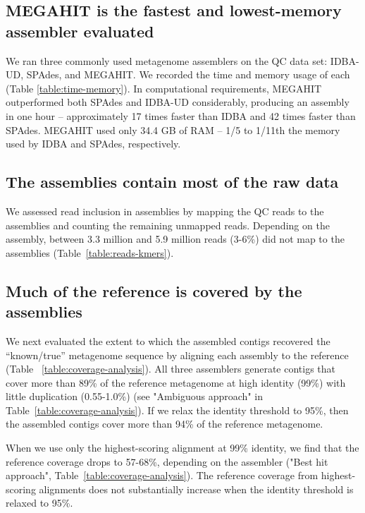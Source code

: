 \documentclass[10pt,a4paper,twocolumn]{article}
\begin{document}
\subsection*{MEGAHIT is the fastest and lowest-memory assembler evaluated}

We ran three commonly used metagenome assemblers on the QC data set:
IDBA-UD, SPAdes, and MEGAHIT. We recorded the time and memory usage of
each (Table \ref{table:time-memory}).  In computational requirements, MEGAHIT outperformed both
SPAdes and IDBA-UD considerably, producing an assembly in one hour --
approximately 17 times faster than IDBA and 42 times faster than
SPAdes.  MEGAHIT used only 34.4 GB of RAM -- 1/5 to 1/11th
the memory used by IDBA and SPAdes, respectively.

\subsection*{The assemblies contain most of the raw data}

We assessed read inclusion in assemblies by mapping the QC reads to
the assemblies and counting the remaining unmapped reads. Depending on
the assembly, between 3.3 million and 5.9 million reads (3-6\%)
did not map to the assemblies (Table~\ref{table:reads-kmers}).

\subsection*{Much of the reference is covered by the assemblies}

We next evaluated the extent to which the assembled contigs recovered the
``known/true'' metagenome sequence by aligning each assembly to the
reference (Table ~\ref{table:coverage-analysis}).  All three
assemblers generate contigs that cover more than 89\% of the reference
metagenome at high identity (99\%) with little duplication
(0.55-1.0\%) (see "Ambiguous approach" in
Table~\ref{table:coverage-analysis}).  If we relax the identity
threshold to 95\%, then the assembled contigs cover more than 94\% of
the reference metagenome.


When we use only the highest-scoring alignment at 99\% identity, we
find that the reference coverage drops to 57-68\%, depending on the
assembler ("Best hit approach",
Table~\ref{table:coverage-analysis}). The reference coverage from
highest-scoring alignments does not substantially increase when the
identity threshold is relaxed to 95\%.
\end{document}
